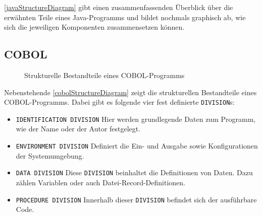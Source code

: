 \autoref{javaStructureDiagram} gibt einen zusammenfassenden Überblick über die erwähnten Teile eines Java-Programms und bildet nochmals graphisch ab, wie sich die jeweiligen Komponenten zusammensetzen können.

\subsection*{COBOL}
{
\begin{wrapfigure}{l}{.5\textwidth}
\centering

\caption{Strukturelle Bestandteile eines COBOL-Programms\label{cobolStructureDiagram}}
\end{wrapfigure}
Nebenstehende \autoref{cobolStructureDiagram} zeigt die strukturellen Bestandteile eines COBOL-Programms. 
Dabei gibt es folgende vier fest definierte \texttt{DIVISION}s:
\begin{itemize}
    \item \texttt{IDENTIFICATION DIVISION}
    Hier werden grundlegende Daten zum Programm, wie der Name oder der Autor festgelegt.
    \item \texttt{ENVIRONMENT DIVISION}
    Definiert die Ein- und Ausgabe sowie Konfigurationen der Systemumgebung.
    \item \texttt{DATA DIVISION}
    Diese \texttt{DIVISION} beinhaltet die Definitionen von Daten. Dazu zählen Variablen oder auch Datei-Record-Definitionen.
    \item \texttt{PROCEDURE DIVISION}
    Innerhalb dieser \texttt{DIVISION} befindet sich der ausführbare Code.
\end{itemize}
}
